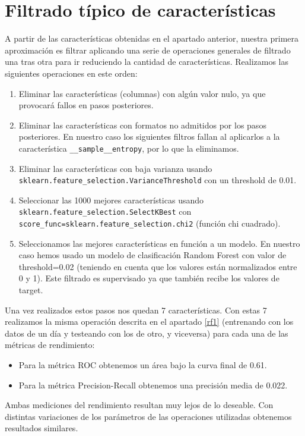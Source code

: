 \documentclass[a4paper,12pt,twoside,oldfontcommands]{memoir}
\begin{document}
	\section{Filtrado típico de características}
	
	A partir de las características obtenidas en el apartado anterior, nuestra primera aproximación es filtrar aplicando una serie de operaciones generales de filtrado una tras otra para ir reduciendo la cantidad de características. Realizamos las siguientes operaciones en este orden: 
	\begin{enumerate}
		\item Eliminar las características (columnas) con algún valor nulo, ya que provocará fallos en pasos posteriores. 
		\item Eliminar las características con formatos no admitidos por los pasos posteriores. En nuestro caso los siguientes filtros fallan al aplicarlos a la característica \texttt{\_\_sample\_\_entropy}, por lo que la eliminamos. 
		\item Eliminar las características con baja varianza usando \texttt{sklearn.feature\_selection.VarianceThreshold} con un threshold de 0.01. 
		\item Seleccionar las 1000 mejores características usando \texttt{sklearn.feature\_selection.SelectKBest} con \texttt{score\_func=sklearn.feature\_selection.chi2} (función chi cuadrado). 
		\item Seleccionamos las mejores características en función a un modelo. En nuestro caso hemos usado un modelo de clasificación Random Forest con valor de threshold=0.02 (teniendo en cuenta que los valores están normalizados entre 0 y 1). Este filtrado es supervisado ya que también recibe los valores de target. 
	\end{enumerate}
	Una vez realizados estos pasos nos quedan 7 características. Con estas 7 realizamos la misma operación descrita en el apartado \ref{rf1} (entrenando con los datos de un día y testeando con los de otro, y viceversa) para cada una de las métricas de rendimiento: 
	
	\begin{itemize}
		\item Para la métrica ROC obtenemos un área bajo la curva final de 0.61. 
		\item Para la métrica Precision-Recall obtenemos una precisión media de 0.022.
	\end{itemize}
	
	Ambas mediciones del rendimiento resultan muy lejos de lo deseable. Con distintas variaciones de los parámetros de las operaciones utilizadas obtenemos resultados similares.
	
\end{document}
